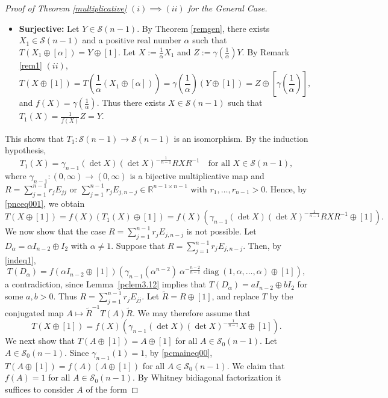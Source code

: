 \documentclass[11pt,reqno]{amsart}
\theoremstyle{plain}
\theoremstyle{definition}
\numberwithin{equation}{section}
\DeclareMathOperator{\diag}{diag}
\def\cS{\mathcal S}
\begin{document}
\begin{proof}[Proof of Theorem \ref{multiplicative} $(i)\implies (ii)$ for the General Case]
\begin{itemize}
		\item \textbf{Surjective:} Let $Y\in \cS(n-1)$. By Theorem \ref{remgen}, there exists $X_1\in \cS(n-1)$ and a positive real number $\alpha$ such that $T(X_1\oplus [\alpha])= Y \oplus [1]$. %
		 Let $X:=\frac{1}{\alpha}X_1$ and $Z:=\gamma\left(\frac{1}{\alpha}\right) Y$. By Remark \ref{rem1} $(ii)$,
		\[T (X\oplus[1]) = T(\frac{1}{\alpha} (X_1\oplus [\alpha]))
		= \gamma\left(\frac{1}{\alpha}\right)  (Y\oplus[1])
		= Z\oplus \left[\gamma\left(\frac{1}{\alpha}\right) \right],\]
and $f(X)=\gamma\left(\frac{1}{\alpha}\right) $. Thus there exists $X \in \cS(n-1)$ such that $T_1(X)=\frac{1}{f(X)}Z=Y$.
	\end{itemize}
This shows that $T_1:\cS(n-1)\to \cS(n-1)$ is an isomorphism.	By the induction hypothesis,
	\[T_1(X) = \gamma_{n-1} (\det X) (\det X)^{-\frac{1}{n-1}} RXR^{-1} \quad \text{for all } X\in \cS(n-1),\] where $\gamma_{n-1}:(0,\infty) \to (0,\infty)$ is a bijective multiplicative map and  $R = \sum\limits_{j=1}^{n-1} r_j E_{jj}$ or $\sum\limits_{j=1}^{n-1} r_jE_{j,n-j}\in \mathbb{R}^{{n-1}\times {n-1}}$ with $r_1,\ldots,r_{n-1}>0$. Hence, by \eqref{pnceq001}, we obtain
	\begin{equation}\label{indeq1}
	T (X\oplus[1])=f(X)\left(T_1(X)\oplus [1]\right)=f(X)\left( \gamma_{n-1} (\det X) (\det X)^{-\frac{1}{n-1}} RXR^{-1} \oplus [1]\right).\end{equation}
We now show that the case $R=\sum\limits_{j=1}^{n-1} r_jE_{j,n-j}$ is not possible.  Let $D_{\alpha}=\alpha I_{n-2}\oplus I_2$ with $\alpha \neq 1$. Suppose that $R=\sum\limits_{j=1}^{n-1} r_jE_{j,n-j}$. Then, by \eqref{indeq1}, \[ T (D_{\alpha})= f(\alpha I_{n-2}\oplus [1])\left( \gamma_{n-1}({\alpha}^{n-2})~ \alpha^{-\frac{n-2}{n-1}} \diag(1,\alpha,\ldots,\alpha)\oplus [1]\right),\] a contradiction, since Lemma~\ref{pclem3.12} implies that $ T(D_{\alpha})=aI_{n-2}\oplus bI_2$ for some $a,b>0$. Thus $R = \sum\limits_{j=1}^{n-1} r_j E_{jj}$. Let $\tilde R = R \oplus [1]$, and replace $T$ by the conjugated map $A \mapsto \tilde R^{-1}  T(A) \tilde R$. We may therefore assume that
 \begin{equation}\label{pcmaineq00}
 T(X \oplus [1]) = f(X)\left(\gamma_{n-1} (\det X) (\det X)^{-\frac{1}{n-1}} X \oplus [1]\right).
 \end{equation}
We next show that $T(A\oplus[1])= A\oplus [1]$ for all $A\in \cS_0(n-1)$.  Let $A\in \cS_0(n-1)$. Since $\gamma_{n-1}(1)=1$, by \eqref{pcmaineq00},  $T(A \oplus [1]) = f(A)\left(A \oplus [1]\right)$ for all $A\in \cS_0(n-1)$.  We claim that $f(A)=1$ for all $A \in \cS_0(n-1)$. By Whitney bidiagonal factorization it suffices to consider $A$ of the form 

\end{proof}
\end{document}
